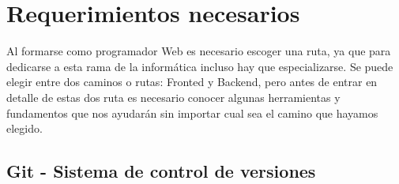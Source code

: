 \documentclass[twocolumns,a4paper]{IEEEtran}
\begin{document}
\section{Requerimientos necesarios}
Al formarse como programador Web es necesario escoger una ruta, ya que para
dedicarse a esta rama de la informática incluso hay que especializarse. Se
puede elegir entre dos caminos o rutas: Fronted y Backend, pero antes de entrar
en detalle de estas dos ruta es necesario conocer algunas herramientas y
fundamentos que nos ayudarán sin importar cual sea el camino que hayamos
elegido.
\subsection{Git - Sistema de control de versiones}
\cite{pascual199012}\cite{mycite2016}\cite{Chavez-Campos2016}\cite{webdev:2018:online}\cite{SergioLujan2001}\cite{NataliaVazquezWeb2007}\cite{WebDev:2018:online}\cite{ScottBenGit2014}\cite{Ssh:2018:online}\cite{HTTP:2018:online}\cite{HTTPS:2018:online}\cite{ChrisNegusLinux2005}\cite{JoyanesProg2008}\cite{GuidesGitHub:2018:online}\cite{HTMLw3:2018:online}\cite{PluralsightJavaScript:2018:online}\cite{JavaScriptw3:2018:online}\cite{PythonTuto:2018:online}\cite{IntroPython2008}


\printbibliography
\end{document}
